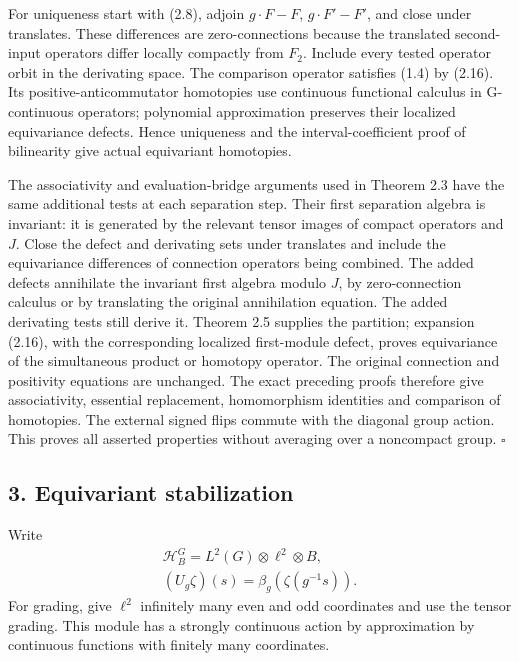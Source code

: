 \documentclass[
  11pt,
]{article}
\begin{document}
For uniqueness start with (2.8), adjoin \(g\cdot F-F\),
\(g\cdot F'-F'\), and close under translates. These differences are
zero-connections because the translated second-input operators differ
locally compactly from \(F_2\). Include every tested operator orbit in
the derivating space. The comparison operator satisfies (1.4) by (2.16).
Its positive-anticommutator homotopies use continuous functional
calculus in G-continuous operators; polynomial approximation preserves
their localized equivariance defects. Hence uniqueness and the
interval-coefficient proof of bilinearity give actual equivariant
homotopies.

The associativity and evaluation-bridge arguments used in Theorem 2.3
have the same additional tests at each separation step. Their first
separation algebra is invariant: it is generated by the relevant tensor
images of compact operators and \(J\). Close the defect and derivating
sets under translates and include the equivariance differences of
connection operators being combined. The added defects annihilate the
invariant first algebra modulo \(J\), by zero-connection calculus or by
translating the original annihilation equation. The added derivating
tests still derive it. Theorem 2.5 supplies the partition; expansion
(2.16), with the corresponding localized first-module defect, proves
equivariance of the simultaneous product or homotopy operator. The
original connection and positivity equations are unchanged. The exact
preceding proofs therefore give associativity, essential replacement,
homomorphism identities and comparison of homotopies. The external
signed flips commute with the diagonal group action. This proves all
asserted properties without averaging over a noncompact group.
\(\square\)

\subsection{3. Equivariant
stabilization}\label{equivariant-stabilization}

Write \[
\begin{gathered}
\mathcal H_B^G=L^2(G)\otimes\ell^2\otimes B,\\
(U_g\zeta)(s)=\beta_g(\zeta(g^{-1}s)).
\end{gathered}
\tag{3.1}
\] For grading, give \(\ell^2\) infinitely many even and odd coordinates
and use the tensor grading. This module has a strongly continuous action
by approximation by continuous functions with finitely many coordinates.
\end{document}

